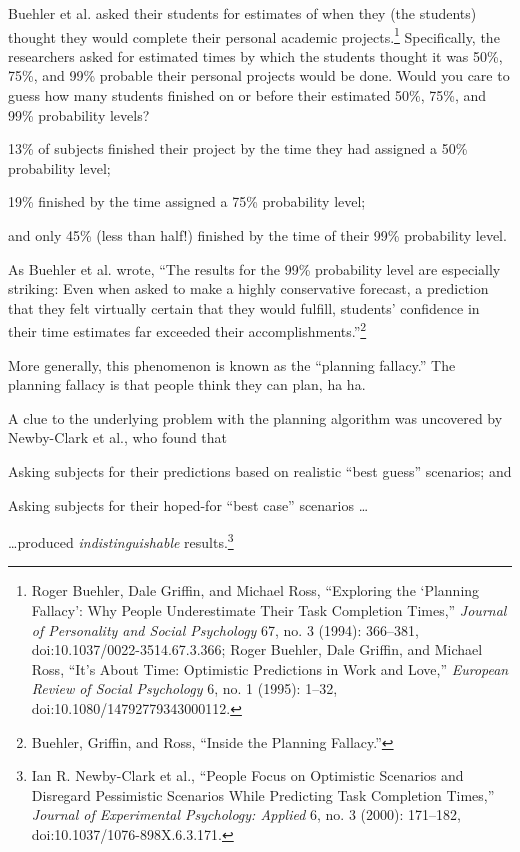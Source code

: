 {
 Buehler et al. asked their students for estimates of when they
(the students) thought they would complete their personal academic
projects.\footnote{Roger Buehler, Dale Griffin, and Michael Ross,
``Exploring the `Planning
Fallacy': Why People Underestimate Their Task
Completion Times,'' \textit{Journal of Personality
and Social Psychology} 67, no. 3 (1994): 366--381,
doi:10.1037/0022-3514.67.3.366; Roger Buehler, Dale Griffin, and
Michael Ross, ``It's About Time:
Optimistic Predictions in Work and Love,''
\textit{European Review of Social Psychology} 6, no. 1 (1995): 1--32,
doi:10.1080/14792779343000112.} Specifically, the researchers asked for
estimated times by which the students thought it was 50\%, 75\%, and
99\% probable their personal projects would be done. Would you care to
guess how many students finished on or before their estimated 50\%,
75\%, and 99\% probability levels?}

{
 13\% of subjects finished their project by the time they had
assigned a 50\% probability level;}

{
 19\% finished by the time assigned a 75\% probability level;}

{
 and only 45\% (less than half!) finished by the time of their 99\%
probability level.}

{
 As Buehler et al. wrote, ``The results for the
99\% probability level are especially striking: Even when asked to make
a highly conservative forecast, a prediction that they felt virtually
certain that they would fulfill, students' confidence
in their time estimates far exceeded their
accomplishments.''\footnote{Buehler, Griffin, and Ross, ``Inside the
Planning Fallacy.''}}

{
 More generally, this phenomenon is known as the
``planning fallacy.'' The planning
fallacy is that people think they can plan, ha ha.}

{
 A clue to the underlying problem with the planning algorithm was
uncovered by Newby-Clark et al., who found that}

{
 Asking subjects for their predictions based on realistic
``best guess'' scenarios; and}

{
 Asking subjects for their hoped-for ``best
case'' scenarios \ldots}

{
 \ldots produced \textit{indistinguishable}
results.\footnote{Ian R. Newby-Clark et al., ``People Focus on
Optimistic Scenarios and Disregard Pessimistic Scenarios While
Predicting Task Completion Times,'' \textit{Journal
of Experimental Psychology: Applied} 6, no. 3 (2000): 171--182,
doi:10.1037/1076-898X.6.3.171.}}

